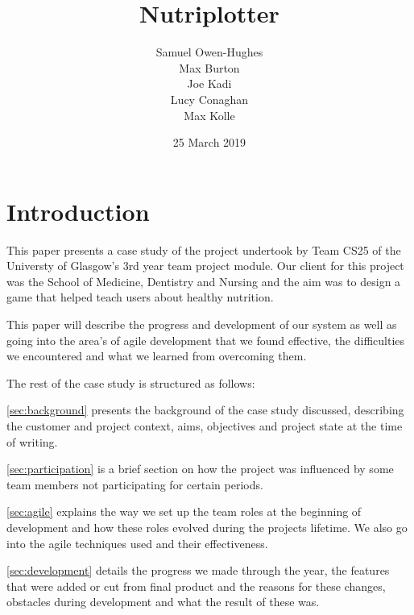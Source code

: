 \documentclass{l3proj}
\begin{document}
\title{Nutriplotter}

\author{Samuel Owen-Hughes \\
        Max Burton \\
        Joe Kadi \\
        Lucy Conaghan \\
        Max Kolle}

\date{25 March 2019}

\maketitle

\educationalconsent

\newpage

\section{Introduction}

This paper presents a case study of the project undertook by Team CS25 of the Universty of Glasgow's 3rd year team project module. Our client for this project was the School of Medicine, Dentistry and Nursing and the aim was to design a game that helped teach users about healthy nutrition.

This paper will describe the progress and development of our system as well as going into the area's of agile development that we found effective, the difficulties we encountered and what we learned from overcoming them.

The rest of the case study is structured as follows:

\ref{sec:background} presents the background of the case study discussed, describing the customer and project context, aims, objectives and project state at the time of writing. 

\ref{sec:participation} is a brief section on how the project was influenced by some team members not participating for certain periods.

\ref{sec:agile} explains the way we set up the team roles at the beginning of development and how these roles evolved during the projects lifetime. We also go into the agile techniques used and their effectiveness.

\ref{sec:development} details the progress we made through the year, the features that were added or cut from final product and the reasons for these changes, obstacles during development and what the result of these was.
\end{document}
